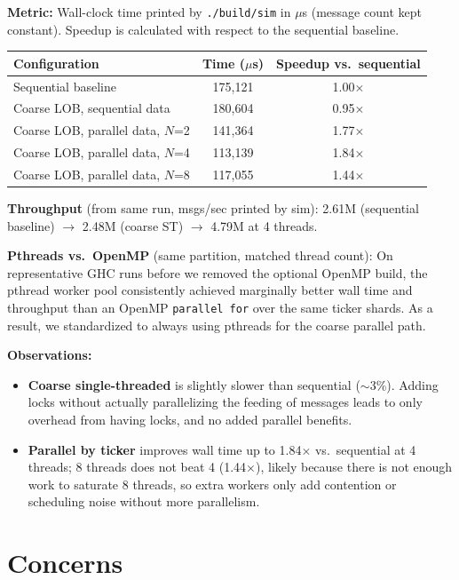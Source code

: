 \documentclass[11pt]{article}
\begin{document}
\textbf{Metric:} Wall-clock time printed by \texttt{./build/sim} in $\mu$s (message count kept constant). Speedup is calculated with respect to the sequential baseline.

\begin{table}[h]
\centering
\begin{tabular}{lcc}
\toprule
\textbf{Configuration} & \textbf{Time ($\mu$s)} & \textbf{Speedup vs.\ sequential} \\
\midrule
Sequential baseline             & 175{,}121 & 1.00$\times$ \\
Coarse LOB, sequential data     & 180{,}604 & 0.95$\times$ \\
Coarse LOB, parallel data, $N$=2 & 141{,}364 & 1.77$\times$ \\
Coarse LOB, parallel data, $N$=4 & 113{,}139 & 1.84$\times$ \\
Coarse LOB, parallel data, $N$=8 & 117{,}055 & 1.44$\times$ \\
\bottomrule
\end{tabular}
\end{table}

\textbf{Throughput} (from same run, msgs/sec printed by sim): 2.61M (sequential baseline) $\rightarrow$ 2.48M (coarse ST) $\rightarrow$ 4.79M at 4 threads.

\textbf{Pthreads vs.\ OpenMP} (same partition, matched thread count): On representative GHC runs before we removed the optional OpenMP build, the pthread worker pool consistently achieved marginally better wall time and throughput than an OpenMP \texttt{parallel for} over the same ticker shards. As a result, we standardized to always using pthreads for the coarse parallel path.

\textbf{Observations:}
\begin{itemize}
    \item \textbf{Coarse single-threaded} is slightly slower than sequential ($\sim$3\%). Adding locks without actually parallelizing the feeding of messages leads to only overhead from having locks, and no added parallel benefits.
    \item \textbf{Parallel by ticker} improves wall time up to 1.84$\times$ vs.\ sequential at 4 threads; 8 threads does not beat 4 (1.44$\times$), likely because there is not enough work to saturate 8 threads, so extra workers only add contention or scheduling noise without more parallelism.
\end{itemize}

\section*{Concerns}
\end{document}
